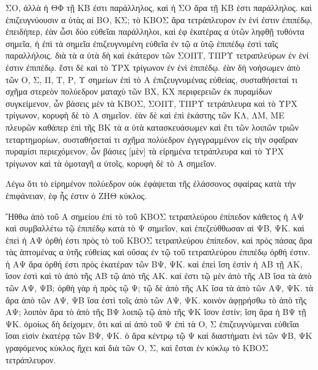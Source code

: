 \begin{Parallel}{}{}
{{ΣΟ, ἀλλὰ ἡ ΘΦ τῇ ΚΒ ἐστι παράλληλος, καὶ ἡ ΣΟ ἄρα τῇ ΚΒ ἐστι παράλληλος. καὶ ἐπιζευγνύουσιν
α ὐτὰς αἱ ΒΟ, ΚΣ; τὸ ΚΒΟΣ ἄρα τετράπλευρον ἐν ἑνί ἐστιν ἐπιπέδῳ, ἐπειδήπερ, ἐὰν ὦσι δύο
εὐθεῖαι παράλληλοι, καὶ ἐφ ἑκατέρας α ὐτῶν ληφθῇ τυθόντα σημεῖα, ἡ ἐπὶ τὰ σημεῖα ἐπιζευγνυμένη
εὐθεῖα ἐν τῷ α ὐτῷ ἐπιπέδῳ ἐστὶ ταῖς παραλλήλοις. διὰ τὰ α ὐτὰ δὴ καὶ ἑκάτερον τῶν ΣΟΠΤ, ΤΠΡΥ
τετραπλεύρων ἐν ἑνί ἐστιν ἐπιπέδῳ. ἔστι δὲ καὶ τὸ ΥΡΧ τρίγωνον ἐν ἑνὶ ἑπιπέδῳ.
ἐὰν δὴ νοήσωμεν ἀπὸ τῶν Ο, Σ, Π, Τ, Ρ, Υ σημείων ἐπὶ τὸ Α
ἐπιζευγνυμένας εὐθείας, συσταθήσεταί τι σχῆμα στερεὸν πολύεδρον ματαχὺ τῶν ΒΧ, ΚΧ περιφερειῶν ἐκ πυραμίδων
συγκείμενον, ὧν βάσεις μὲν τὰ ΚΒΟΣ, ΣΟΠΤ, ΤΠΡΥ τετράπλευρα καὶ τὸ ΥΡΧ τρίγωνον, κορυφὴ δὲ τὸ Α σημεῖον. ἐὰν
δὲ καὶ ἐπὶ ἑκάστης τῶν ΚΛ, ΛΜ, ΜΕ πλευρῶν καθάπερ ἐπὶ τῆς ΒΚ τὰ α ὐτὰ κατασκευάσωμεν καὶ
ἔτι τῶν λοιπῶν τριῶν τεταρτημορίων, συσταθήσεταί τι σχῆμα πολύεδρον ἐγγεγραμμένον εἰς τὴν σφαῖραν
πυραμίσι περιεχόμενον, ὧν βάσιες [μὲν] τὰ εἰρημένα τετράπλευρα καὶ τὸ ΥΡΧ τρίγωνον καὶ τὰ ὁμοταγῆ
α ὐτοῖς, κορυφὴ δὲ τὸ Α σημεῖον.}

{\greekfont Λέγω ὅτι τὸ εἰρημένον πολύεδρον οὐκ ἐφάψεται τῆς ἐλάσσονος σφαίρας κατὰ τὴν ἐπιφάνειαν, ἐφ ἧς
ἐστιν ὁ ΖΗΘ κύκλος.}

{\greekfont Ἤθθω ἀπὸ τοῦ Α σημείου ἐπὶ τὸ τοῦ ΚΒΟΣ τετραπλεύρου ἐπίπεδον 
κάθετος ἡ ΑΨ καὶ συμβαλλέτω
τῷ ἐπιπέδῳ κατὰ τὸ Ψ σημεῖον, καὶ ἐπεζεύθθωσαν αἱ  ΨΒ, ΨΚ. καὶ ἐπεὶ ἡ ΑΨ ὀρθή ἐστι
πρὸς τὸ τοῦ ΚΒΟΣ τετραπλεύρου ἐπίπεδον, καὶ πρὸς πάσας ἄρα τὰς ἁπτομένας α ὐτῆς εὐθείας
καὶ οὔσας ἐν τῷ τοῦ τετραπλεύρου ἐπιπέδῳ ὀρθή ἐστιν. ἡ ΑΨ ἄρα ὀρθή ἐστι πρὸς ἑκατέραν τῶν ΒΨ, ΨΚ.
καὶ ἐπεὶ ἴση ἐστὶν ἡ ΑΒ τῇ ΑΚ, ἵσον ἐστὶ καὶ τὸ ἀπὸ
τῆς ΑΒ τῷ ἀπὸ τῆς ΑΚ. καί ἐστι τῷ μὲν ἀπὸ τῆς ΑΒ ἴσα  τὰ ἀπὸ τῶν ΑΨ, ΨΒ; ὀρθὴ γὰρ ἡ πρὸς τῷ Ψ; τῷ δὲ ἀπὸ τῆς ΑΚ ἴσα τὰ ἀπὸ τῶν
ΑΨ, ΨΚ. τὰ ἄρα ἀπὸ τῶν ΑΨ, ΨΒ ἴσα ἐστὶ τοῖς ἀπὸ τῶν ΑΨ, ΨΚ. κοινὸν ἀφῃρήσθω τὸ ἀπὸ τῆς
ΑΨ; λοιπὸν  ἄρα τὸ ἀπὸ τῆς ΒΨ λοιπῷ τῷ ἀπὸ τῆς ΨΚ ἴσον ἐστίν; ἴση ἄρα
ἡ ΒΨ τῇ ΨΚ. ὁμοίως δὴ δείχομεν, ὅτι καὶ  αἱ ἀπὸ τοῦ Ψ ἐπὶ τὰ Ο, Σ ἐπιζευγνύμεναι
εὐθεῖαι ἴσαι εἰσὶν ἑκατέρᾳ τῶν ΒΨ, ΨΚ. ὁ ἄρα κέντρῳ τῷ Ψ καὶ διαστήματι ἑνὶ τῶν ΨΒ, ΨΚ
γραφόμενος κύκλος ἥχει καὶ διὰ τῶν Ο, Σ, καὶ ἔσται ἐν κύκλῳ τὸ ΚΒΟΣ τετράπλευρον.}

}
\end{Parallel}
